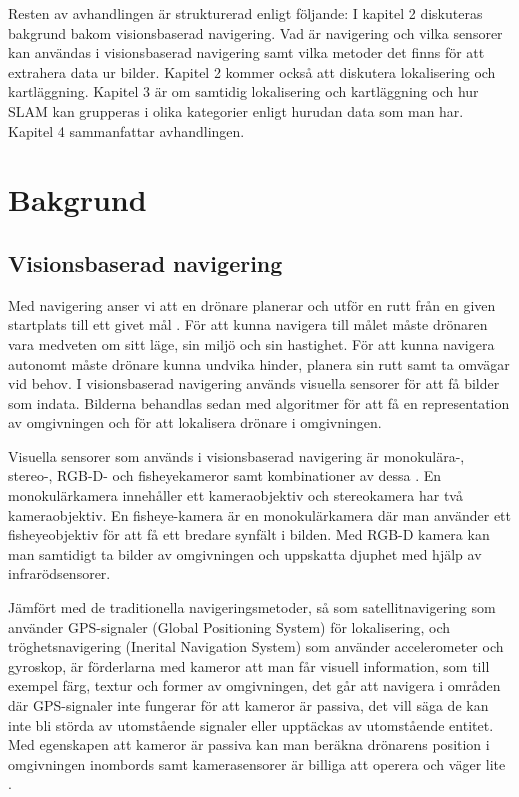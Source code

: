 Resten av avhandlingen är strukturerad enligt följande: I kapitel 2 diskuteras bakgrund bakom visionsbaserad navigering. Vad är navigering och vilka sensorer kan användas i visionsbaserad navigering samt vilka metoder det finns för att extrahera data ur bilder. Kapitel 2 kommer också att diskutera lokalisering och kartläggning. Kapitel 3 är om samtidig lokalisering och kartläggning och hur SLAM kan grupperas i olika kategorier enligt hurudan data som man har. Kapitel 4 sammanfattar avhandlingen.

\chapter{Bakgrund}

\section{Visionsbaserad navigering}

Med navigering anser vi att en drönare planerar och utför en rutt från en given startplats till ett givet mål \citep{geospatial}. För att kunna navigera till målet måste drönaren vara medveten om sitt läge, sin miljö och sin hastighet. För att kunna navigera autonomt måste drönare kunna undvika hinder, planera sin rutt samt ta omvägar vid behov. I visionsbaserad navigering används visuella sensorer för att få bilder som indata. Bilderna behandlas sedan med algoritmer för att få en representation av omgivningen och för att lokalisera drönare i omgivningen. 

Visuella sensorer som används i visionsbaserad navigering är monokulära-, stereo-, RGB-D- och fisheyekameror samt kombinationer av dessa \citep{geospatial}. En monokulärkamera innehåller ett kameraobjektiv och stereokamera har två kameraobjektiv. En fisheye-kamera är en monokulärkamera där man använder ett fisheyeobjektiv för att få ett bredare synfält i bilden. Med RGB-D kamera kan man samtidigt ta bilder av omgivningen och uppskatta djuphet med hjälp av infrarödsensorer. 

Jämfört med de traditionella navigeringsmetoder, så som satellitnavigering som använder GPS-signaler (Global Positioning System) för lokalisering, och tröghetsnavigering (Inerital Navigation System) som använder accelerometer och gyroskop, är förderlarna med kameror att man får visuell information, som till exempel färg, textur och former av omgivningen, det går att navigera i områden där GPS-signaler inte fungerar för att kameror är passiva, det vill säga de kan inte bli störda av utomstående signaler eller upptäckas av utomstående entitet. Med egenskapen att kameror är passiva kan man beräkna drönarens position i omgivningen inombords samt kamerasensorer är billiga att operera och väger lite \citep{opticalflowuav,geospatial}.

